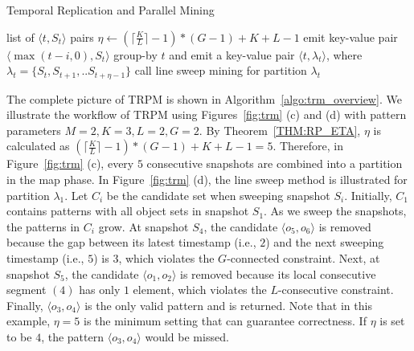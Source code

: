 \begin{algorithm}[h]
\caption{Temporal Replication and Parallel Mining}
\label{algo:trm_overview}
\begin{algorithmic}[1]
\Require list of $\langle t, S_t \rangle$ pairs
\State $\eta \gets (\lceil \frac{K}{L} \rceil -1)*(G-1)+K+L-1$
\label{code:trm-map-start}
		\State emit key-value pair $\langle \max(t-i,0), S_t \rangle$ 
	\EndFor  
\EndFor
\label{code:trm-map-end}
\label{code:trm-par-start}
\State group-by $t$ and emit a key-value pair $\langle t, \lambda_t\rangle$, where $\lambda_t = \{S_t, S_{t+1}, .. S_{t+\eta-1}\} $
\EndFor
\label{code:trm-par-end}
\label{code:trm-red-start}
\State call line sweep mining for partition $\lambda_t$
\label{code:trm-red-end}
\EndFor
\end{algorithmic}
\end{algorithm}

The complete picture of TRPM is shown in Algorithm~\ref{algo:trm_overview}. We illustrate the  workflow of TRPM using Figures~\ref{fig:trm} (c) and (d) with pattern
parameters $M=2, K=3, L = 2, G=2$. By Theorem~\ref{THM:RP_ETA}, $\eta$ is calculated
as $(\lceil \frac{K}{L} \rceil-1) *(G-1)+ K + L - 1 = 5$. Therefore, 
in Figure~\ref{fig:trm} (c), every $5$ consecutive snapshots are combined 
into a partition in the map phase. In Figure~\ref{fig:trm} (d), the line sweep
method is illustrated for partition $\lambda_1$. Let $C_i$ be the candidate set when sweeping snapshot $S_i$.
Initially, $C_1$ contains 
patterns with 
all object sets in 
snapshot 
$S_1$.
As we sweep the snapshots, the patterns in $C_i$ grow.
At snapshot 
$S_4$, the candidate
$\langle o_5,o_6 \rangle$ is removed because the gap between its latest timestamp (i.e., $2$)
and the next sweeping timestamp (i.e., $5$) is $3$, which violates the $G$-connected constraint.
Next, at snapshot 
$S_5$, the candidate $\langle o_1,o_2 \rangle$ is removed
because its local consecutive segment $(4)$ has only $1$ element,
which violates the $L$-consecutive constraint.
Finally, $\langle o_3,o_4 \rangle$ is the only valid pattern and is returned. 
Note that in this example, $\eta=5$ is the minimum setting that 
can guarantee correctness. If $\eta$ is set to be $4$, the pattern $\langle o_3,o_4 \rangle$ would be missed. 




